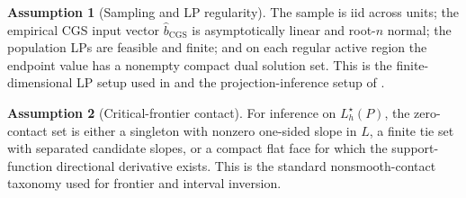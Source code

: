 \documentclass[11pt]{article}
\theoremstyle{definition}
\newtheorem{assumption}{Assumption}
\theoremstyle{plain}
\theoremstyle{remark}
\begin{document}
\begin{assumption}[Sampling and LP regularity]\label{ass:sampling-lp}
The sample is iid across units; the empirical CGS input vector
\(\widehat b_{\mathrm{CGS}}\) is asymptotically linear and root-\(n\) normal;
the population LPs are feasible and finite; and on each regular active region
the endpoint value has a nonempty compact dual solution set.  This is the
finite-dimensional LP setup used in \cite{Voronin2025} and the
projection-inference setup of \cite{KaidoMolinariStoye2019}.
\end{assumption}

\begin{assumption}[Critical-frontier contact]\label{ass:frontier-contact}
For inference on \(L_h^\star(P)\), the zero-contact set is either a singleton
with nonzero one-sided slope in \(L\), a finite tie set with separated
candidate slopes, or a compact flat face for which the support-function
directional derivative exists.  This is the standard nonsmooth-contact
taxonomy used for frontier and interval inversion.
\end{assumption}
\end{document}
